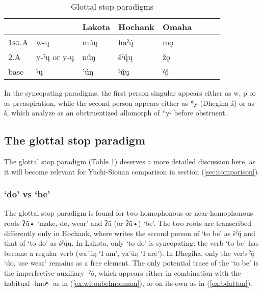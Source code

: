\documentclass[oneside,a4paper,11pt]{article}
\newcommand{\ipa}[1]{{\phon#1}} %
\begin{document}
\begin{table}[H]
\caption{Glottal stop paradigms} \label{tab:glottal} \centering
\begin{tabular}{llllllll}
\toprule
 & 	 & 	Lakota & 	Hochank & 	Omaha & \\
 \midrule
\textsc{1sg.A} & 	\ipa{*w-ų}   & 	\ipa{múŋ} & 	\ipa{haˀų́} & 	\ipa{mǫ} & \\
2.A & 	\ipa{*y-ˀų} or 	\ipa{*y-ų}  & 	\ipa{núŋ} & 	\ipa{šˀų́ų} & 	\ipa{žǫ} &\\ 
base & 	\ipa{*ˀų} & 	\ipa{'úŋ} & 	\ipa{ˀų́ų} & 	\ipa{ˀǫ́} & \\
\bottomrule
\end{tabular}
\end{table}

In the syncopating paradigms, the first person singular appears either as \ipa{*w}, \ipa{*p} or as preaspiration, while the second person appears either as *\ipa{y-}(Dhegiha \ipa{ž}) or as \ipa{š}, which \citet{rankin15csd} analyze as an obstruentized allomorph of *\ipa{y-} before obstruent.

\subsection{The glottal stop paradigm} \label{sec:glottal}
The glottal stop paradigm (Table \ref{tab:glottal}) deserves a more detailed discussion here, as it will become relevant for Yuchi-Siouan comparison in section (\ref{sec:comparison}).


\subsubsection{`do' vs `be'}
The glottal stop paradigm is found for two homophonous or near-homophonous roots \ipa{*ʔṹ•}  `make, do, wear' and \ipa{*ʔṹ}  (or  \ipa{*ʔṹ•}) `be'. The two roots are transcribed differently only in Hochank, where \citet{helmbrecht06hocak} writes the second person of `to be' as \ipa{šˀų́} and that of `to do' as \ipa{šˀų́ų}. In Lakota, only `to do' is syncopating: the verb `to be' has become a regular verb (\ipa{wa'úŋ} `I am', \ipa{ya'úŋ} `I are'). In Dhegiha, only the verb \ipa{ˀǫ́} `do, use wear' remains as a free element. The only potential trace of the `to be' is the imperfective auxiliary \ipa{-ˀǫ́}, which appears either in combination with the habitual \ipa{-hnoⁿ-} as in (\ref{ex:witonbehnonmon}), or on its own as in (\ref{ex:bdattan}).
\end{document}
